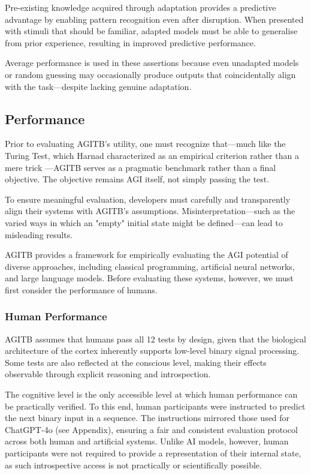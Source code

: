 \documentclass{article}
\begin{document}
Pre-existing knowledge acquired through adaptation provides a predictive advantage by enabling pattern recognition even after disruption. When presented with stimuli that should be familiar, adapted models must be able to generalise from prior experience, resulting in improved predictive performance.

Average performance is used in these assertions because even unadapted models or random guessing may occasionally produce outputs that coincidentally align with the task—despite lacking genuine adaptation.

\subsection{Performance}

Prior to evaluating AGITB’s utility, one must recognize that—much like the Turing Test, which Harnad characterized as an empirical criterion rather than a mere trick \cite{Harnad1992}—AGITB serves as a pragmatic benchmark rather than a final objective. The objective remains AGI itself, not simply passing the test.

To ensure meaningful evaluation, developers must carefully and transparently align their systems with AGITB's assumptions. Misinterpretation—such as the varied ways in which an "empty" initial state might be defined—can lead to
misleading results.

AGITB provides a framework for empirically evaluating the AGI potential of diverse approaches, including classical programming, artificial neural networks, and large language models. Before evaluating these systems, however, we must first consider the performance of humans.

\subsubsection{Human Performance}

AGITB assumes that humans pass all 12 tests by design, given that the biological architecture of the cortex inherently supports low-level binary signal processing. Some tests are also reflected at the conscious level, making their effects observable through explicit reasoning and introspection.

The cognitive level is the only accessible level at which human performance can be practically verified. To this end, human participants were instructed to predict the next binary input in a sequence. The instructions mirrored those used for ChatGPT-4o (see Appendix), ensuring a fair and consistent evaluation protocol across both human and artificial systems. Unlike AI models, however, human participants were not required to provide a representation of their internal state, as such introspective access is not practically or scientifically possible.
\end{document}
